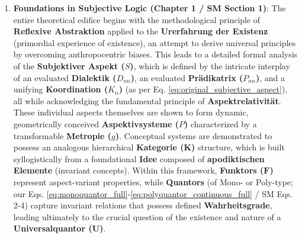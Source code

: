 \documentclass[
    12pt,              %
    a4paper,           %
    headings=normal,   %
    twoside=true,      %
    BCOR=8mm,          %
]{scrbook}
\newcommand{\kategorie}{\bm{K}}
\newcommand{\universalquantor}{\bm{U}}
\newcommand{\aspektivsystem}{P}
\newcommand{\funktor}{\bm{F}}
\newcommand{\subjektiveraspekt}{S}
\begin{document}
\begin{enumerate}
    \item \textbf{Foundations in Subjective Logic (Chapter 1 / SM Section 1)}: The entire theoretical edifice begins with the methodological principle of \textbf{Reflexive Abstraktion} applied to the \textbf{Urerfahrung der Existenz} (primordial experience of existence), an attempt to derive universal principles by overcoming anthropocentric biases. This leads to a detailed formal analysis of the \textbf{Subjektiver Aspekt (\(\subjektiveraspekt\))}, which is defined by the intricate interplay of an evaluated \textbf{Dialektik (\(D_{nn}\))}, an evaluated \textbf{Prädikatrix (\(P_{nn}\))}, and a unifying \textbf{Koordination (\(K_n\))} (as per Eq. \eqref{eq:original_subjective_aspect}), all while acknowledging the fundamental principle of \textbf{Aspektrelativität}. These individual aspects themselves are shown to form dynamic, geometrically conceived \textbf{Aspektivsysteme (\(\aspektivsystem\))} characterized by a transformable \textbf{Metropie (\(g\))}. Conceptual systems are demonstrated to possess an analogous hierarchical \textbf{Kategorie (\(\kategorie\))} structure, which is built syllogistically from a foundational \textbf{Idee} composed of \textbf{apodiktischen Elemente} (invariant concepts). Within this framework, \textbf{Funktors (\(\funktor\))} represent aspect-variant properties, while \textbf{Quantors} (of Mono- or Poly-type; our Eqs. \eqref{eq:monoquantor_full}-\eqref{eq:polyquantor_continuous_full} / SM Eqs. 2-4) capture invariant relations that possess defined \textbf{Wahrheitsgrade}, leading ultimately to the crucial question of the existence and nature of a \textbf{Universalquantor (\(\universalquantor\))}.


\end{enumerate}
\end{document}
